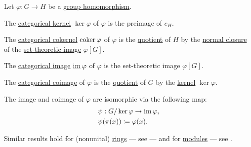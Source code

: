 \begin{proposition}\label{thm:group_zero_morphisms}
  Let \( \varphi: G \to H \) be a \hyperref[def:group/homomorphism]{group homomorphism}.

  \begin{thmenum}
     The \hyperref[def:zero_morphisms/kernel]{categorical kernel} \( \ker \varphi \) of \( \varphi \) is the preimage of \( e_H \).

     The \hyperref[def:zero_morphisms/kernel]{categorical cokernel} \( \operatorname*{co\negthinspace\ker} \varphi \) of \( \varphi \) is the \hyperref[def:group/quotient]{quotient} of \( H \) by the \hyperref[def:normal_closure]{normal closure} of the \hyperref[def:set_valued_map/image]{set-theoretic image} \( \varphi[G] \).

     The \hyperref[def:zero_morphisms/image]{categorical image} \( \operatorname{im} \varphi \) of \( \varphi \) is the set-theoretic image \( \varphi[G] \).

     The \hyperref[def:zero_morphisms/coimage]{categorical coimage} of \( \varphi \) is the \hyperref[def:group/quotient]{quotient} of \( G \) by the \hyperref[def:group/kernel]{kernel} \( \ker \varphi \).

     The image and coimage of \( \varphi \) are isomorphic via the following map:
    \begin{equation}\label{eq:thm:group_zero_morphisms/isomorphism}
      \begin{aligned}
        &\psi: G / \ker \varphi \to \operatorname{im} \varphi, \\
        &\psi(\pi(x)) \coloneqq \varphi(x).
      \end{aligned}
    \end{equation}
  \end{thmenum}
\end{proposition}
\begin{comments}
  \item Similar results hold for (nonunital) \hyperref[def:ring]{rings} --- see  --- and for \hyperref[def:module]{modules} --- see .
\end{comments}

